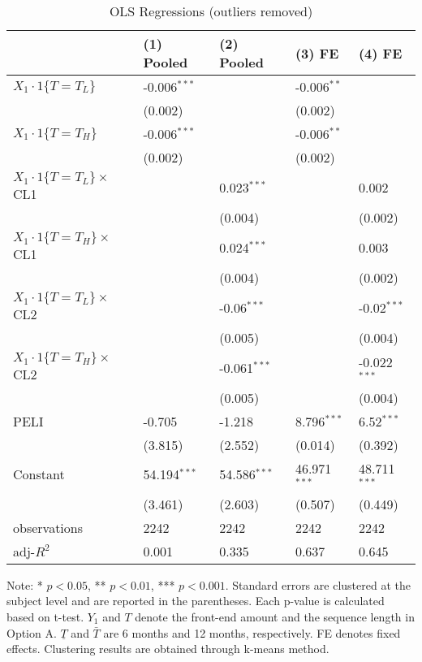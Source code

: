 \documentclass[12pt]{article}
\begin{document}
\begin{table}
    \caption{OLS Regressions (outliers removed)}
    \vspace*{12pt}
    \centering

      \begin{tabular}{lllll}
\hline
 & (1) Pooled & (2) Pooled & (3) FE & (4) FE \\
\hline
$X_1\cdot1\{T=T_L\}$ & -0.006$^{***}$ &  & -0.006$^{**}$ &  \\
 & (0.002) &  & (0.002) &  \\
$X_1\cdot1\{T=T_H\}$ & -0.006$^{***}$ &  & -0.006$^{**}$ &  \\
 & (0.002) &  & (0.002) &  \\
$X_1\cdot1\{T=T_L\}\times$CL1 &  & 0.023$^{***}$ &  & 0.002 \\
 &  & (0.004) &  & (0.002) \\
$X_1\cdot1\{T=T_H\}\times$CL1 &  & 0.024$^{***}$ &  & 0.003 \\
 &  & (0.004) &  & (0.002) \\
$X_1\cdot1\{T=T_L\}\times$CL2 &  & -0.06$^{***}$ &  & -0.02$^{***}$ \\
 &  & (0.005) &  & (0.004) \\
$X_1\cdot1\{T=T_H\}\times$CL2 &  & -0.061$^{***}$ &  & -0.022$^{***}$ \\
 &  & (0.005) &  & (0.004) \\
PELI & -0.705 & -1.218 & 8.796$^{***}$ & 6.52$^{***}$ \\
 & (3.815) & (2.552) & (0.014) & (0.392) \\
Constant & 54.194$^{***}$ & 54.586$^{***}$ & 46.971$^{***}$ & 48.711$^{***}$ \\
 & (3.461) & (2.603) & (0.507) & (0.449) \\\hline

observations & 2242 & 2242 & 2242 & 2242 \\
adj-$R^2$ & 0.001 & 0.335 & 0.637 & 0.645 \\
\hline
\end{tabular}

    \vspace*{4pt}
    \centering
    \begin{minipage}{0.85\textwidth}
    {\par\footnotesize Note: * $p<0.05$, ** $p<0.01$, *** $p<0.001$. Standard errors are clustered at the subject level and are reported in the parentheses. Each p-value is calculated based on t-test. $Y_1$ and $T$ denote the front-end amount and the sequence length in Option A. $\underline{T}$ and $\bar{T}$ are 6 months and 12 months, respectively. FE denotes fixed effects. Clustering results are obtained through k-means method.}
    \end{minipage}
    \label{tab:seq_value_ols}
\end{table}
\end{document}
